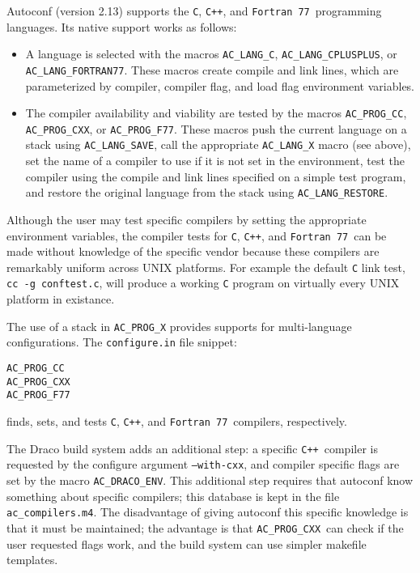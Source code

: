 \documentclass[11pt]{nmemo}
\newcommand{\cpp}{\texttt{C++}}
\newcommand{\fseventyseven}{\texttt{Fortran 77}}
\newcommand{\langc}{\texttt{AC\_LANG\_C}}
\newcommand{\langcplusplus}{\texttt{AC\_LANG\_CPLUSPLUS}}
\newcommand{\langfseventyseven}{\texttt{AC\_LANG\_FORTRAN77}}
\newcommand{\progcc}{\texttt{AC\_PROG\_CC}}
\newcommand{\progcxx}{\texttt{AC\_PROG\_CXX}}
\newcommand{\progfseventyseven}{\texttt{AC\_PROG\_F77}}
\newcommand{\langsave}{\texttt{AC\_LANG\_SAVE}}
\newcommand{\langrestore}{\texttt{AC\_LANG\_RESTORE}}
\begin{document}
Autoconf (version 2.13) supports the \texttt{C}, \cpp, and
\fseventyseven\ programming languages.  Its native support works as
follows:
\begin{itemize} 
\item A language is selected with the macros \langc, \langcplusplus,
or \langfseventyseven.  These macros create compile and link lines,
which are parameterized by compiler, compiler flag, and load flag
environment variables.
\item The compiler availability and viability are tested by the macros
\progcc, \progcxx, or \progfseventyseven.  These macros push the
current language on a stack using \langsave, call the appropriate
\texttt{AC\_LANG\_X} macro (see above), set the name of a compiler to
use if it is not set in the environment, test the compiler using the
compile and link lines specified on a simple test program, and restore
the original language from the stack using \langrestore.
\end{itemize}
Although the user may test specific compilers by setting the
appropriate environment variables, the compiler tests for \texttt{C},
\cpp, and \fseventyseven\ can be made without knowledge of the
specific vendor because these compilers are remarkably uniform across
UNIX platforms.  For example the default \texttt{C} link test,
\texttt{cc -g conftest.c}, will produce a working \texttt{C} program
on virtually every UNIX platform in existance.

The use of a stack in \texttt{AC\_PROG\_X} provides supports for
multi-language configurations.  The \texttt{configure.in} file
snippet:
\begin{verbatim}
AC_PROG_CC
AC_PROG_CXX
AC_PROG_F77
\end{verbatim}
finds, sets, and tests \texttt{C}, \cpp, and \fseventyseven\ compilers,
respectively.

The Draco build system adds an additional step: a specific \cpp\
compiler is requested by the configure argument \texttt{--with-cxx},
and compiler specific flags are set by the macro
\texttt{AC\_DRACO\_ENV}.  This additional step requires that autoconf
know something about specific compilers; this database is kept in the
file \texttt{ac\_compilers.m4}.  The disadvantage of giving autoconf
this specific knowledge is that it must be maintained; the advantage
is that \progcxx\ can check if the user requested flags
work, and the build system can use simpler makefile templates.
\end{document}
